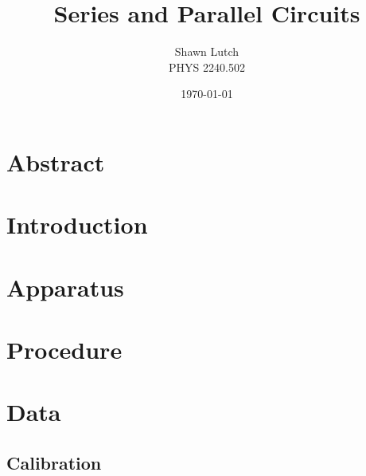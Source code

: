\documentclass[12pt,letterpaper,titlepage]{report}
\newcommand{\myTitle}{Series and Parallel Circuits}
\newcommand{\myName}{Shawn Lutch}
\newcommand{\myPeriod}{PHYS 2240.502}
\begin{document}


\title{\myTitle{}}
\author{\myName{}\\ \myPeriod{}}
\date{\today}
\maketitle




\section*{Abstract}




\section*{Introduction}




\section*{Apparatus}




\section*{Procedure}




\section*{Data}


\subsection*{Calibration}

\begin{minipage}{\linewidth}
\centering
{}

\end{minipage}

\bigskip
\bigskip

\begin{minipage}{\linewidth}
\centering
{}

\end{minipage}
\end{document}
